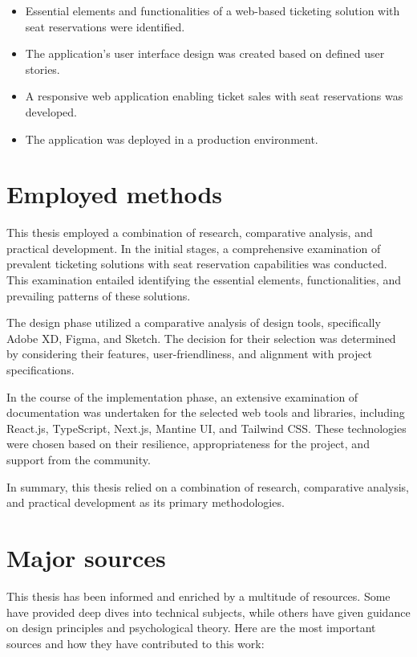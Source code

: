 \begin{itemize}
    \item Essential elements and functionalities of a web-based ticketing solution with seat reservations were identified.
    \item The application's user interface design was created based on defined user stories.
    \item A responsive web application enabling ticket sales with seat reservations was developed.
    \item The application was deployed in a production environment.
\end{itemize}

\section*{Employed methods}
\label{sec:employed-methods}
This thesis employed a combination of research, comparative analysis, and practical development.
In the initial stages, a comprehensive examination of prevalent ticketing solutions with seat reservation capabilities was conducted.
This examination entailed identifying the essential elements, functionalities, and prevailing patterns of these solutions.

The design phase utilized a comparative analysis of design tools, specifically Adobe XD, Figma, and Sketch.
The decision for their selection was determined by considering their features, user-friendliness, and alignment with project specifications.

In the course of the implementation phase, an extensive examination of documentation was undertaken for the selected web tools and libraries, including React.js, TypeScript, Next.js, Mantine UI, and Tailwind CSS.
These technologies were chosen based on their resilience, appropriateness for the project, and support from the community.

In summary, this thesis relied on a combination of research, comparative analysis, and practical development as its primary methodologies.

\section*{Major sources}
\label{sec:major-sources}
This thesis has been informed and enriched by a multitude of resources.
Some have provided deep dives into technical subjects, while others have given guidance on design principles and psychological theory.
Here are the most important sources and how they have contributed to this work:

